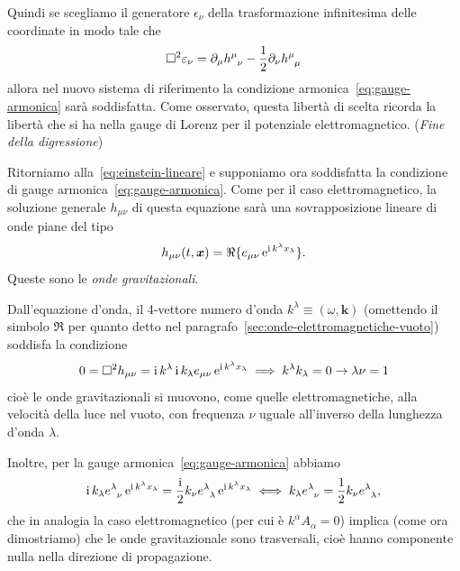 Quindi se scegliamo il generatore $\epsilon_{\nu}$ della trasformazione
infinitesima delle coordinate in modo tale che
\begin{equation}
  \dalamb \epsilon_{\nu} = \partial_{\mu} \tensor{h}{^{\mu}_{\nu}} -
  \frac{1}{2} \partial_{\nu} \tensor{h}{^{\mu}_{\mu}}
\end{equation}
allora nel nuovo sistema di riferimento la condizione
armonica~\eqref{eq:gauge-armonica} sarà soddisfatta.  Come osservato, questa
libertà di scelta ricorda la libertà che si ha nella gauge di Lorenz per il
potenziale elettromagnetico. (\emph{Fine della digressione})

Ritorniamo alla~\eqref{eq:einstein-lineare} e supponiamo ora soddisfatta la
condizione di gauge armonica~\eqref{eq:gauge-armonica}.  Come per il caso
elettromagnetico, la soluzione generale $h_{\mu\nu}$ di questa equazione sarà
una sovrapposizione lineare di onde piane del tipo
\begin{equation}
  h_{\mu\nu}(t,\bm{x}) = \Re\{e_{\mu\nu} \operatorname{\mathrm{e}}^{\operatorname{\mathrm{i}} k^{\lambda}x_{\lambda}} \}.
\end{equation}
Queste sono le \emph{onde gravitazionali}.

Dall'equazione d'onda, il 4-vettore numero d'onda $k^{\lambda} \equiv (\omega,
\bm{k})$ (omettendo il simbolo $\Re$ per quanto detto nel
paragrafo~\ref{sec:onde-elettromagnetiche-vuoto}) soddisfa la condizione
\begin{equation}
  0 = \Box^{2} h_{\mu\nu} = \operatorname{\mathrm{i}} k^{\lambda} \operatorname{\mathrm{i}} k_{\lambda} e_{\mu\nu}
  \operatorname{\mathrm{e}}^{\operatorname{\mathrm{i}} k^{\lambda}x_{\lambda}} \implies k^{\lambda}k_{\lambda} = 0
  \rightarrow \lambda \nu=1
\end{equation}
cioè le onde gravitazionali si muovono, come quelle elettromagnetiche, alla
velocità della luce nel vuoto, con frequenza $\nu$ uguale all'inverso della
lunghezza d'onda $\lambda$.

Inoltre, per la  gauge armonica~\eqref{eq:gauge-armonica} abbiamo
\begin{equation}
  \uimm k_{\lambda} \tensor{e}{^{\lambda}_{\nu}} \e^{\uimm k^{\lambda}
    x_{\lambda}} = \frac{\uimm}{2} k_{\nu}
  \tensor{e}{^{\lambda}_{\lambda}} \e^{\uimm k^{\lambda}x_{\lambda}} \iff
  k_{\lambda} \tensor{e}{^{\lambda}_{\nu}} = \frac{1}{2} k_{\nu}
  \tensor{e}{^{\lambda}_{\lambda}},
  \label{8.22}
\end{equation}
che in analogia la caso elettromagnetico (per cui è $k^{\alpha} A_{\alpha}=0$)
implica (come ora dimostriamo) che le onde gravitazionale sono trasversali, cioè
hanno componente nulla nella direzione di propagazione.


